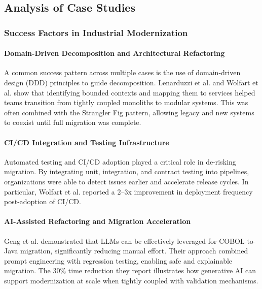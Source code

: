 \documentclass[12pt]{article}
\begin{document}
\subsection{Analysis of Case Studies}

\subsubsection{Success Factors in Industrial Modernization}

\paragraph{Domain-Driven Decomposition and Architectural Refactoring}

A common success pattern across multiple cases is the use of domain-driven design (DDD) principles to guide decomposition. Lenarduzzi et al. \cite{lenarduzzi2020} and Wolfart et al. \cite{wolfart2021} show that identifying bounded contexts and mapping them to services helped teams transition from tightly coupled monoliths to modular systems. This was often combined with the Strangler Fig pattern, allowing legacy and new systems to coexist until full migration was complete.

\paragraph{CI/CD Integration and Testing Infrastructure}

Automated testing and CI/CD adoption played a critical role in de-risking migration. By integrating unit, integration, and contract testing into pipelines, organizations were able to detect issues earlier and accelerate release cycles. In particular, Wolfart et al. reported a 2–3x improvement in deployment frequency post-adoption of CI/CD.

\paragraph{AI-Assisted Refactoring and Migration Acceleration}

Geng et al. \cite{geng2024} demonstrated that LLMs can be effectively leveraged for COBOL-to-Java migration, significantly reducing manual effort. Their approach combined prompt engineering with regression testing, enabling safe and explainable migration. The 30\% time reduction they report illustrates how generative AI can support modernization at scale when tightly coupled with validation mechanisms.
\end{document}
